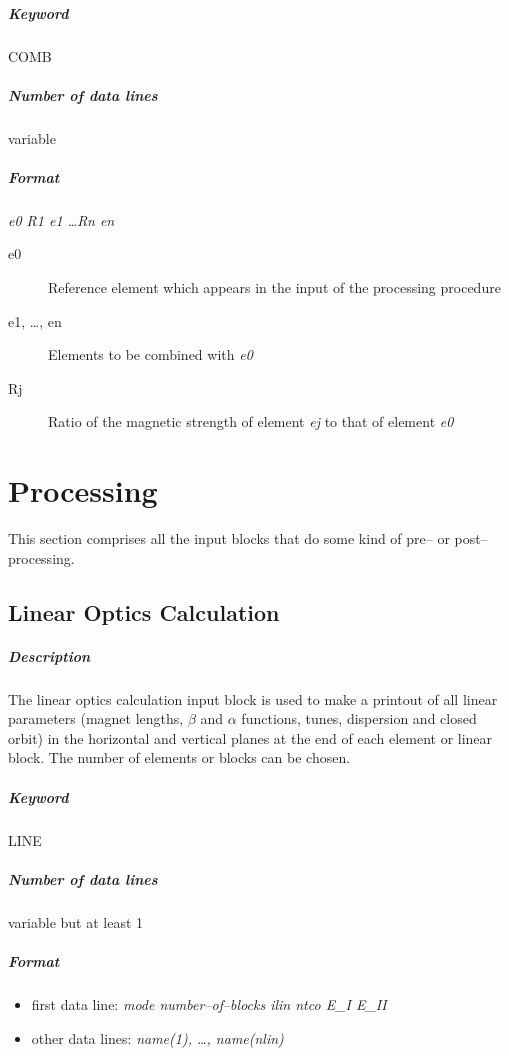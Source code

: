 \documentclass[a4paper,11pt]{report}
\begin{document}
\subparagraph{Keyword} COMB \subparagraph{Number of data lines}
variable

\subparagraph{Format} {\em e0 R1 e1 \dots Rn en}

\begin{description}
\item [e0] Reference element which appears in the input of the
  processing procedure
\item [e1, \dots, en] Elements to be combined with {\em e0}
\item [Rj] Ratio of the magnetic strength of element {\em ej} \/to
  that of element {\em e0}
\end{description}

\section{Processing}

This section comprises all the input blocks that do some kind of pre--
or post--processing.

\subsection{Linear Optics Calculation} \label{LinOpt}

\subparagraph{Description} The linear optics calculation input block
is used to make a printout of all linear parameters (magnet lengths,
$\beta$ and $\alpha$ functions, tunes, dispersion and closed orbit) in
the horizontal and vertical planes at the end of each element or
linear block.  The number of elements or blocks can be chosen.

\subparagraph{Keyword} LINE \subparagraph{Number of data lines}
variable but at least 1

\subparagraph{Format}
\begin{itemize}
\item first data line: {\em mode number--of--blocks ilin ntco E\_I E\_II}
\item other data lines: {\em name(1), \dots , name(nlin)}
\end{itemize}
\end{document}
